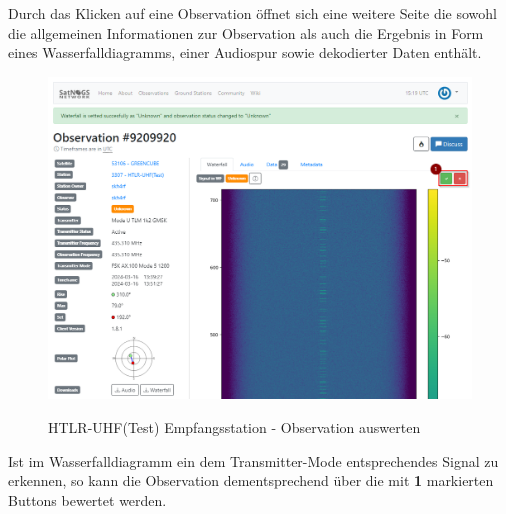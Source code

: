 Durch das Klicken auf eine Observation öffnet sich eine weitere Seite die sowohl die allgemeinen Informationen zur Observation als auch die Ergebnis in Form eines Wasserfalldiagramms, einer Audiospur sowie dekodierter Daten enthält. 

\begin{figure} [H]
	\centering
	\includegraphics[width=\linewidth]{../ref/vet_observation.png}
	\caption{HTLR-UHF(Test) Empfangsstation - Observation auswerten} \cite{noauthor_satnogs_nodate}
	\label{fig:htrl-uhf(test)vetobservation}
\end{figure}

Ist im Wasserfalldiagramm ein dem Transmitter-Mode entsprechendes Signal zu erkennen, so kann die Observation dementsprechend über die mit \textbf{1} markierten Buttons bewertet werden.


